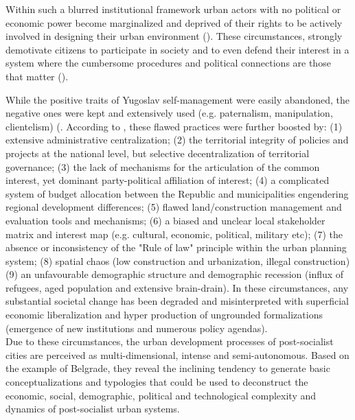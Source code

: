 \documentclass[11pt]{report}
\begin{document}
{{{{\begin{itemize}
Within such a blurred institutional framework urban actors with no political or economic power become marginalized and deprived of their rights to be actively involved in designing their urban environment (\href{Bolay}{\citealt{bolay_urban_2005}}).
These circumstances, strongly demotivate citizens to participate in society and to even defend their interest in a system where the cumbersome procedures and political connections are those that matter (\href{Vujovic}{\citealt{vujovic_belgrades_2007}}).
\end{itemize}

While the positive traits of Yugoslav self-management were easily abandoned, the negative ones were kept and extensively used (e.g. paternalism, manipulation, clientelism) (\href{Vujosevic}{\citealt{vujosevic_conundrum_2012}}.
According to \href{Vujosevic}{\cite{vujosevic_regionalizam_2015}},
these flawed practices were further boosted by:
(1) extensive administrative centralization;
(2) the territorial integrity of policies and projects at the national level, but selective decentralization of territorial governance;
(3) the lack of mechanisms for the articulation of the common interest, yet dominant party-political affiliation of interest;
(4) a complicated system of budget allocation between the Republic and municipalities engendering regional development differences;
(5) flawed land/construction management and evaluation tools and mechanisms;
(6) a biased and unclear local stakeholder matrix and interest map (e.g. cultural, economic, political, military etc);
(7) the absence or inconsistency of the "Rule of law" principle within the urban planning system;
(8) spatial chaos (low construction and urbanization, illegal construction)
(9) an unfavourable demographic structure and demographic recession (influx of refugees, aged population and extensive brain-drain).
In these circumstances, any substantial societal change has been  degraded  and  misinterpreted  with  superficial  economic  liberalization  and  hyper  production  of ungrounded formalizations (emergence of new institutions and numerous policy agendas). 
\\

Due to these circumstances, the urban development processes of post-socialist cities are perceived as multi-dimensional, intense and semi-autonomous.
Based on the example of Belgrade, they reveal the inclining tendency to generate basic conceptualizations and typologies that could be used to deconstruct the economic, social, demographic, political and technological complexity and dynamics of post-socialist urban systems.
  
}}}}
\end{document}
